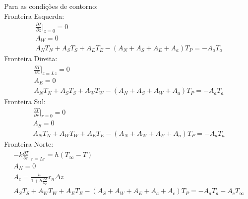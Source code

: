 \documentclass[11pt]{extarticle}
\begin{document}
Para as condições de contorno: \\
Fronteira Esquerda:
\begin{gather}     
\frac{\partial T}{\partial z}\biggr\rvert_{z=0}=0\\
A_W=0\\
A_N T_N+A_S T_S+A_E T_E-(A_N+A_S+A_E+A_a)T_P=-A_a T_a
\end{gather} 
Fronteira Direita:
\begin{gather}     
\frac{\partial T}{\partial z}\biggr\rvert_{z=Lz}=0\\
A_E=0\\
A_N T_N+A_S T_S+A_W T_W-(A_N+A_S+A_W+A_a)T_P=-A_a T_a
\end{gather} 
Fronteira Sul:
\begin{gather}     
\frac{\partial T}{\partial r}\biggr\rvert_{r=0}=0\\
A_S=0\\
A_N T_N+A_W T_W+A_E T_E-(A_N+A_W+A_E+A_a)T_P=-A_a T_a
\end{gather} 
Fronteira Norte:
\begin{gather}     
-k\frac{\partial T}{\partial r}\biggr\rvert_{r=Lr}=h(T_\infty-T)\\
A_N=0\\
A_c=\frac{h}{1+h\frac{\Delta r}{k_P}}r_n \Delta z\\
A_S T_S+A_W T_W+A_E T_E-(A_S+A_W+A_E+A_a+A_c)T_P=-A_a T_a-A_cT_\infty
\end{gather} 
\end{document}
